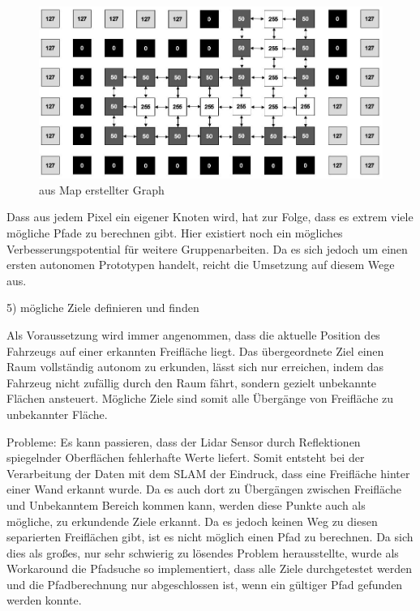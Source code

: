 \begin{figure}[h]
\begin{center}
\includegraphics[width=15cm]{images/chapter5/GraphKnoten.jpg}
\caption{aus Map erstellter Graph}
\label{Map_aus_Graph}
\end{center}
\end{figure}


Dass aus jedem Pixel ein eigener Knoten wird, hat zur Folge, dass es extrem viele mögliche Pfade zu berechnen gibt. Hier existiert noch ein mögliches Verbesserungspotential für weitere Gruppenarbeiten. Da es sich jedoch um einen ersten autonomen Prototypen handelt, reicht die Umsetzung auf diesem Wege aus.




5) mögliche Ziele definieren und finden

Als Voraussetzung wird immer angenommen, dass die aktuelle Position des Fahrzeugs auf einer erkannten Freifläche liegt. Das übergeordnete Ziel einen Raum vollständig autonom zu erkunden, lässt sich nur erreichen, indem das Fahrzeug nicht zufällig durch den Raum fährt, sondern gezielt unbekannte Flächen ansteuert. Mögliche Ziele sind somit alle Übergänge von Freifläche zu unbekannter Fläche. 

Probleme:
Es kann passieren, dass der Lidar Sensor durch Reflektionen spiegelnder Oberflächen fehlerhafte Werte liefert. Somit entsteht bei der Verarbeitung der Daten mit dem SLAM der Eindruck, dass eine Freifläche hinter einer Wand erkannt wurde. Da es auch dort zu Übergängen zwischen Freifläche und Unbekanntem Bereich kommen kann, werden diese Punkte auch als mögliche, zu erkundende Ziele erkannt. Da es jedoch keinen Weg zu diesen separierten Freiflächen gibt, ist es nicht möglich einen Pfad zu berechnen. Da sich dies als großes, nur sehr schwierig zu lösendes Problem herausstellte, wurde als Workaround die Pfadsuche so implementiert, dass alle Ziele durchgetestet werden und die Pfadberechnung nur abgeschlossen ist, wenn ein gültiger Pfad gefunden werden konnte.


